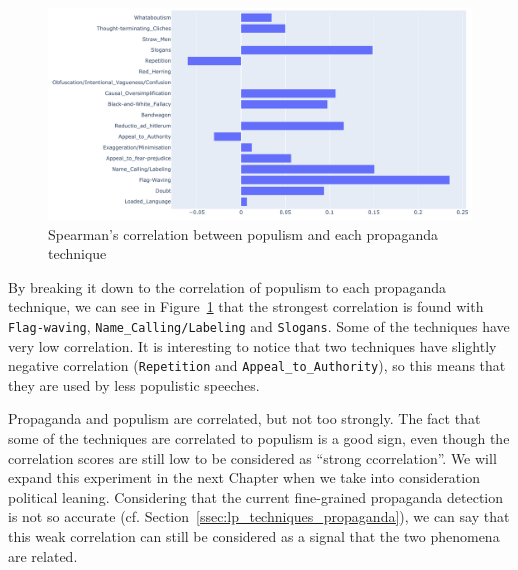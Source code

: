 \begin{figure}[!htbp]
    \centering
    \includegraphics[width=\linewidth]{figures/populism_propaganda_correlation.pdf}
    \caption{Spearman's correlation between populism and each propaganda technique}
    \label{fig:populism_propaganda_correlation}
\end{figure}

By breaking it down to the correlation of populism to each propaganda technique, we can see in Figure~\ref{fig:populism_propaganda_correlation} that the strongest correlation is found with \texttt{Flag-waving}, \texttt{Name\_Calling/Labeling} and \texttt{Slogans}. Some of the techniques have very low correlation. It is interesting to notice that two techniques have slightly negative correlation (\texttt{Repetition} and \texttt{Appeal\_to\_Authority}), so this means that they are used by less populistic speeches.



Propaganda and populism are correlated, but not too strongly.
The fact that some of the techniques are correlated to populism is a good sign, even though the correlation scores are still low to be considered as ``strong ccorrelation''. We will expand this experiment in the next Chapter when we take into consideration political leaning.
Considering that the current fine-grained propaganda detection is not so accurate (cf. Section~\ref{ssec:lp_techniques_propaganda}), we can say that this weak correlation can still be considered as a signal that the two phenomena are related.



